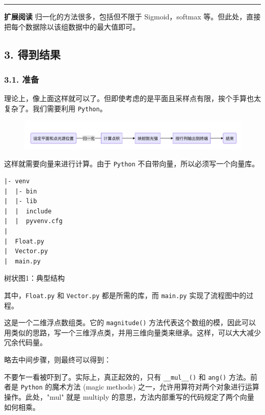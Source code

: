\documentclass[
]{article}
\begin{document}
\begin{center}\rule{0.5\linewidth}{0.5pt}\end{center}

\textbf{扩展阅读} 归一化的方法很多，包括但不限于 Sigmoid，softmax
等。但此处，直接把每个数据除以该组数据中的最大值即可。

\hypertarget{3-ux5f97ux5230ux7ed3ux679c}{%
\subsection{3. 得到结果}\label{3-ux5f97ux5230ux7ed3ux679c}}

\hypertarget{31-ux51c6ux5907}{%
\subsubsection{3.1. 准备}\label{31-ux51c6ux5907}}

理论上，像上面这样就可以了。但即使考虑的是平面且采样点有限，挨个手算也太复杂了。我们需要利用
\texttt{Python}。

\begin{figure}
\centering
\includegraphics[width=8.20833in,height=\textheight]{image-20210722003504821.png}
\caption{}
\end{figure}

这样就需要向量来进行计算。由于 \texttt{Python}
不自带向量，所以必须写一个向量库。

\begin{verbatim}
|- venv
|  |- bin
|  |- lib
|  |  include
|  |  pyvenv.cfg
|
|  Float.py
|  Vector.py
|  main.py
\end{verbatim}

  树状图1：典型结构

其中，\texttt{Float.py} 和 \texttt{Vector.py} 都是所需的库，而
\texttt{main.py} 实现了流程图中的过程。

  

这是一个二维浮点数组类。它的 \texttt{magnitude()}
方法代表这个数组的模，因此可以用类似的思路，写一个三维浮点类，并用三维向量类来继承。这样，可以大大减少冗余代码量。

略去中间步骤，则最终可以得到：

  

不要乍一看被吓到了。实际上，真正起效的，只有 \texttt{\_\_mul\_\_()} 和
\texttt{ang()} 方法。前者是 \texttt{Python} 的魔术方法 (magic methods)
之一，允许用算符对两个对象进行运算操作。此处，"mul" 就是 multiply
的意思，方法内部重写的代码规定了两个向量如何相乘。
\end{document}

